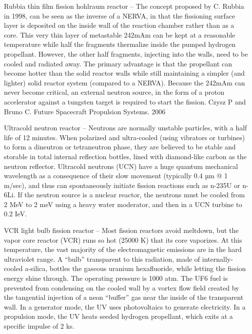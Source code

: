 \documentclass[a4paper]{book}
\begin{document}
Rubbia thin film fission hohlraum reactor – The concept proposed by C. Rubbia in 1998, can be seen as the inverse of a NERVA, in that the fissioning surface layer is deposited on the inside wall of the reaction chamber rather than as a core.  This very thin layer of metastable 242mAm can be kept at a reasonable temperature while half the fragments thermalize inside the pumped hydrogen propellant.   However, the other half fragments, injecting into the walls, need to be cooled and radiated away.   The primary advantage is that the propellant can become hotter than the solid reactor walls while still maintaining a simpler (and lighter) solid reactor system (compared to a NERVA).  Because the 242mAm can never become critical, an external neutron source, in the form of a proton accelerator against a tungsten target is required to start the fission.
Czysz P and Bruno C. Future Spacecraft Propulsion Systems. 2006
 
Ultracold neutron reactor – Neutrons are normally unstable particles, with a half life of 12 minutes.  When polarized and ultra-cooled (using vibrators or turbines) to form a dineutron or tetraneutron phase, they are believed to be stable and storable in total internal reflection bottles, lined with diamond-like carbon as the neutron reflector. Ultracold neutrons (UCN) have a huge quantum mechanical wavelength as a consequence of their slow movement (typically 0.4 µm @ 1 m/sec), and thus can spontaneously initiate fission reactions such as n-235U or n-6Li.   If the neutron source is a nuclear reactor, the neutrons must be cooled from 2 MeV to 2 meV using a heavy water moderator, and then in a UCN turbine to 0.2 IeV. 
 
VCR light bulb fission reactor – Most fission reactors avoid meltdown, but the vapor core reactor (VCR) runs so hot (25000 K) that its core vaporizes.  At this temperature, the vast majority of the electromagnetic emissions are in the hard ultraviolet range. A “bulb” transparent to this radiation, made of internally-cooled a-silica, bottles the gaseous uranium hexafluoride, while letting the fission energy shine through.  The operating pressure is 1000 atm.  The UF6 fuel is prevented from condensing on the cooled wall by a vortex flow field created by the tangential injection of a neon “buffer” gas near the inside of the transparent wall.  In a generator mode, the UV uses photovoltaics to generate electricity. In a propulsion mode, the UV heats seeded hydrogen propellant, which exits at a specific impulse of 2 ks.
\end{document}
